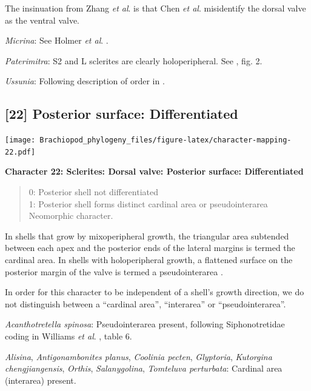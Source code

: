 \documentclass[openany]{book}
\theoremstyle{definition}
\theoremstyle{definition}
\theoremstyle{definition}
\theoremstyle{remark}
\begin{document}
The insinuation from Zhang \emph{et al}.
\citeyearpar{Zhang2009Architectureand} is that Chen \emph{et al}.
\citeyearpar{Chen2007Reinterpretationof} misidentify the dorsal valve as
the ventral valve.

\hypertarget{Micrina-coding-21}{}
\emph{Micrina}: See Holmer \emph{et al}.
\citeyearpar{Holmer2008TheEarly}.

\hypertarget{Paterimitra-coding-21}{}
\emph{Paterimitra}: S2 and L sclerites are clearly holoperipheral. See
\citet{Larsson2014iPaterimitra}, fig. 2.

\hypertarget{Ussunia-coding-21}{}
\emph{Ussunia}: Following description of order in
\citet{Williams2000LinguliformeaCraniiformea}.

\subsection*{{[}22{]} Posterior surface:
Differentiated}\label{posterior-surface-differentiated}

\texttt{[image: Brachiopod\_phylogeny\_files/figure-latex/character-mapping-22.pdf]}

\textbf{Character 22: Sclerites: Dorsal valve: Posterior surface:
Differentiated}

\begin{quote}
0: Posterior shell not differentiated\\
1: Posterior shell forms distinct cardinal area or pseudointerarea\\
Neomorphic character.
\end{quote}

In shells that grow by mixoperipheral growth, the triangular area
subtended between each apex and the posterior ends of the lateral
margins is termed the cardinal area. In shells with holoperipheral
growth, a flattened surface on the posterior margin of the valve is
termed a pseudointerarea
\citep[paraphrasing][]{Williams1997Introduction}.

In order for this character to be independent of a shell's growth
direction, we do not distinguish between a ``cardinal area'',
``interarea'' or ``pseudointerarea''.

\hypertarget{Acanthotretella_spinosa-coding-22}{}
\emph{Acanthotretella spinosa}: Pseudointerarea present, following
Siphonotretidae coding in Williams \emph{et al}.
\citeyearpar{Williams2000LinguliformeaCraniiformea}, table 6.

\hypertarget{Alisina-coding-22}{}
\emph{Alisina}, \emph{Antigonambonites planus}, \emph{Coolinia pecten},
\emph{Glyptoria}, \emph{Kutorgina chengjiangensis}, \emph{Orthis},
\emph{Salanygolina}, \emph{Tomteluva perturbata}: Cardinal area
(interarea) present.
\end{document}
